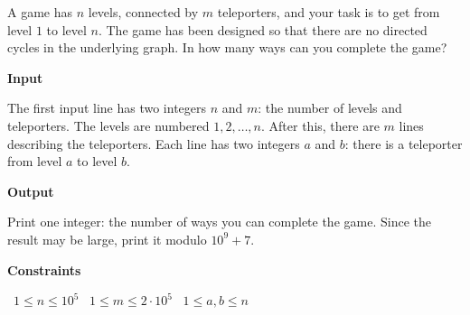 A game has $n$ levels, connected by $m$ teleporters, and your task is to get from level $1$ to level $n$. The game has been designed so that there are no directed cycles in the underlying graph. In how many ways can you complete the game?

\vspace{0.3cm}\noindent\textbf{Input}

The first input line has two integers $n$ and $m$: the number of levels and teleporters. The levels are numbered $1,2,\dots,n$.
After this, there are $m$ lines describing the teleporters. Each line has two integers $a$ and $b$: there is a teleporter from level $a$ to level $b$.

\vspace{0.3cm}\noindent\textbf{Output}

Print one integer: the number of ways you can complete the game. Since the result may be large, print it modulo $10^9+7$.

\vspace{0.3cm}\noindent\textbf{Constraints}

\textbullet\ $1 \le n \le 10^5$
\textbullet\ $1 \le m \le 2 \cdot 10^5$
\textbullet\ $1 \le a,b \le n$